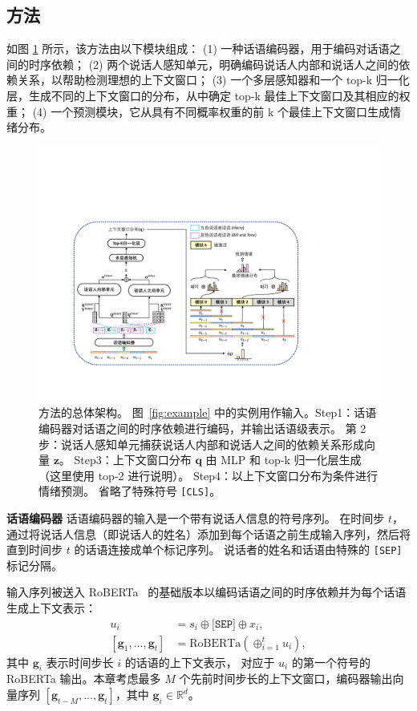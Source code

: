 \subsection{方法}
如图 \ref{fig:overview} 所示，该方法由以下模块组成：
(1) 一种话语编码器，用于编码对话语之间的时序依赖；
(2) 两个说话人感知单元，明确编码说话人内部和说话人之间的依赖关系，以帮助检测理想的上下文窗口；
(3) 一个多层感知器和一个 top-k 归一化层，生成不同的上下文窗口的分布，从中确定 top-k 最佳上下文窗口及其相应的权重；
(4) 一个预测模块，它从具有不同概率权重的前 k 个最佳上下文窗口生成情绪分布。
\begin{figure}[ht]
\centering
\includegraphics[width=\textwidth]{erc_pics/overview.pdf}
\caption{方法的总体架构。 图~\ref{fig:example} 中的实例用作输入。Step1：话语编码器对话语之间的时序依赖进行编码，并输出话语级表示。 第 2 步：说话人感知单元捕获说话人内部和说话人之间的依赖关系形成向量 $\mathbf{z}$。 Step3：上下文窗口分布 $\mathbf{q}$ 由 MLP 和 top-k 归一化层生成（这里使用 top-2 进行说明）。 Step4：以上下文窗口分布为条件进行情绪预测。 省略了特殊符号 \texttt{[CLS]}。}\label{fig:overview}
\end{figure}

\noindent\textbf{话语编码器 } 话语编码器的输入是一个带有说话人信息的符号序列。 在时间步 $t$，通过将说话人信息（即说话人的姓名）添加到每个话语之前生成输入序列，然后将直到时间步 $t$ 的话语连接成单个标记序列。 说话者的姓名和话语由特殊的 \texttt{[SEP]} 标记分隔。

输入序列被送入 RoBERTa~\cite{liu2019roberta} 的基础版本以编码话语之间的时序依赖并为每个话语生成上下文表示：
\begin{align}
    u_i &= s_i \oplus \texttt{[SEP]} \oplus x_i, \nonumber \\
    \left[\mathbf{g}_1, ...,\mathbf{g}_t\right] &= \textrm{RoBERTa}(\oplus_{i=1}^t u_i), \nonumber
\end{align}
其中 $\mathbf{g}_i$ 表示时间步长 $i$ 的话语的上下文表示，
对应于 $u_i$ 的第一个符号的 RoBERTa 输出。本章考虑最多 $M$ 个先前时间步长的上下文窗口，编码器输出向量序列 $\left[\mathbf{g}_{t-M}, ... , \mathbf{g}_t\right]$，其中 $\mathbf{g}_i \in \mathbb{R}^d$。

